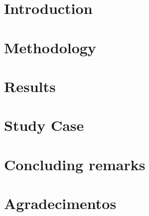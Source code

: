 \documentclass[preprint,11pt]{elsarticle}
\theoremstyle{plain}
\theoremstyle{definition}
\theoremstyle{remark}
\begin{document}
\linenumbers

\section{Introduction}                      \label{intro}
\section{Methodology}                       \label{metho}
\section{Results}                           \label{resul}
\section{Study Case}                        \label{study_case}
\section{Concluding remarks}                \label{concl}

\section{Agradecimentos}







\end{document}
